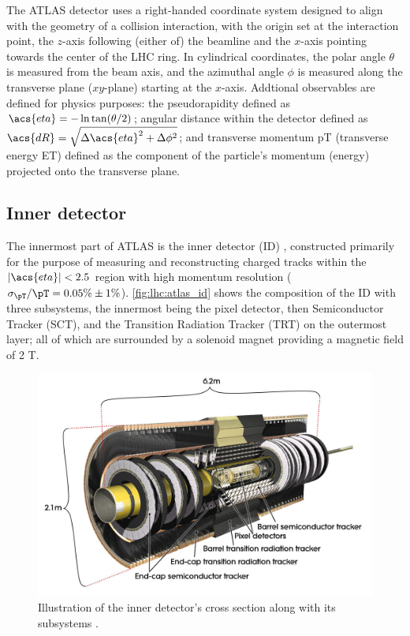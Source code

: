 \documentclass[../thesis.tex]{subfiles}
\begin{document}
The \acs{ATLAS} detector uses a right-handed coordinate system \citep{atlas} designed to align with the geometry of a collision interaction, with the origin set at the interaction point, the $z$-axis following (either of) the beamline and the $x$-axis pointing towards the center of the \acs{LHC} ring. In cylindrical coordinates, the polar angle $\theta$ is measured from the beam axis, and the azimuthal angle $\phi$ is measured along the transverse plane ($xy$-plane) starting at the $x$-axis. Addtional observables are defined for physics purposes: the pseudorapidity defined as $\acs{eta} = -\ln \tan (\theta/2)$; angular distance within the detector defined as $\acs{dR} = \sqrt{\Delta \acs{eta}^2 + \Delta\phi^2}$; and transverse momentum \acs{pT} (transverse energy \acs{ET}) defined as the component of the particle's momentum (energy) projected onto the transverse plane. 

\subsection{Inner detector}
The innermost part of \acs{ATLAS} is the inner detector (\acs{ID}) \citep{atlas}, constructed primarily for the purpose of measuring and reconstructing charged tracks within the $|\acs{eta}|<2.5$ region with high momentum resolution ($\sigma_{\pT} / \pT = 0.05\% \pm 1\%$). \autoref{fig:lhc:atlas_id} shows the composition of the \acs{ID} with three subsystems, the innermost being the pixel detector, then Semiconductor Tracker (\acs{SCT}), and the Transition Radiation Tracker (\acs{TRT}) on the outermost layer; all of which are surrounded by a solenoid magnet providing a magnetic field of 2 T.

\begin{figure}[!htb]
\begin{center}
\includegraphics[width=0.7\linewidth]{fig/lhc_atlas_id.jpg}
\caption[Illustration of the inner detector's cross section along with its subsystems.]{\label{fig:lhc:atlas_id}Illustration of the inner detector's cross section along with its subsystems \citep{lhc:atlas_id}.}
\end{center}
\end{figure}
\end{document}
